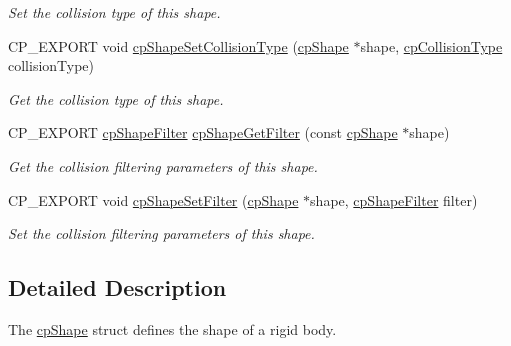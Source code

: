 \begin{DoxyCompactItemize}
\begin{DoxyCompactList}\small\item\em Set the collision type of this shape. \end{DoxyCompactList}\item 
\mbox{\label{group__cp_shape_ga9c7e4dbae5ea13116d7ebb85eded14d6}} 
C\+P\+\_\+\+E\+X\+P\+O\+RT void \mbox{\hyperlink{group__cp_shape_ga9c7e4dbae5ea13116d7ebb85eded14d6}{cp\+Shape\+Set\+Collision\+Type}} (\mbox{\hyperlink{structcp_shape}{cp\+Shape}} $\ast$shape, \mbox{\hyperlink{group__basic_types_gae83e2f50965eb441e36ffff1e32e6d02}{cp\+Collision\+Type}} collision\+Type)
\begin{DoxyCompactList}\small\item\em Get the collision type of this shape. \end{DoxyCompactList}\item 
\mbox{\label{group__cp_shape_ga9f6fa02cd5ca57dacaa8400c0585137b}} 
C\+P\+\_\+\+E\+X\+P\+O\+RT \mbox{\hyperlink{structcp_shape_filter}{cp\+Shape\+Filter}} \mbox{\hyperlink{group__cp_shape_ga9f6fa02cd5ca57dacaa8400c0585137b}{cp\+Shape\+Get\+Filter}} (const \mbox{\hyperlink{structcp_shape}{cp\+Shape}} $\ast$shape)
\begin{DoxyCompactList}\small\item\em Get the collision filtering parameters of this shape. \end{DoxyCompactList}\item 
\mbox{\label{group__cp_shape_gaf7e77e7de50960b9aecf627706a5e747}} 
C\+P\+\_\+\+E\+X\+P\+O\+RT void \mbox{\hyperlink{group__cp_shape_gaf7e77e7de50960b9aecf627706a5e747}{cp\+Shape\+Set\+Filter}} (\mbox{\hyperlink{structcp_shape}{cp\+Shape}} $\ast$shape, \mbox{\hyperlink{structcp_shape_filter}{cp\+Shape\+Filter}} filter)
\begin{DoxyCompactList}\small\item\em Set the collision filtering parameters of this shape. \end{DoxyCompactList}\end{DoxyCompactItemize}


\subsection{Detailed Description}
The \mbox{\hyperlink{structcp_shape}{cp\+Shape}} struct defines the shape of a rigid body. 

